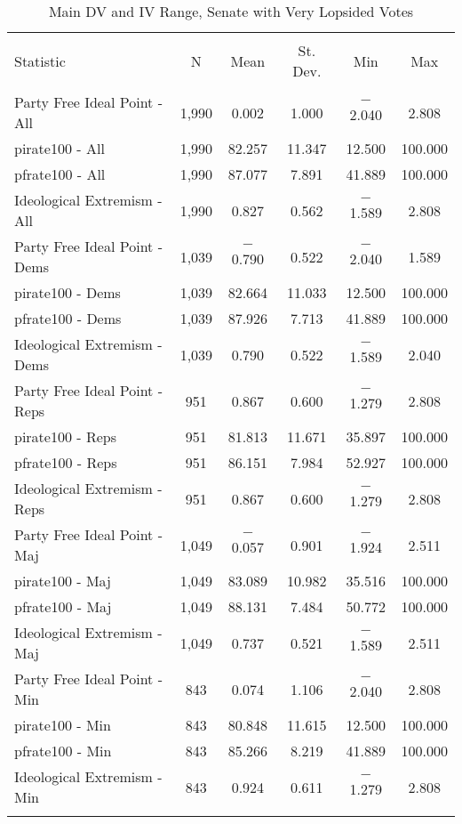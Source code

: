 \documentclass[12pt]{article}
\begin{document}
\begin{table}[!htbp] \centering 
	\caption{Main DV and IV Range, Senate with Very Lopsided Votes} 
	\begin{tabular}{@{\extracolsep{5pt}}lccccc} 
		\\[-1.8ex]\hline 
		\hline \\[-1.8ex] 
		Statistic & \multicolumn{1}{c}{N} & \multicolumn{1}{c}{Mean} & \multicolumn{1}{c}{St. Dev.} & \multicolumn{1}{c}{Min} & \multicolumn{1}{c}{Max} \\ 
		\hline \\[-1.8ex] 
		Party Free Ideal Point - All & 1,990 & 0.002 & 1.000 & $-$2.040 & 2.808 \\ 
		pirate100 - All & 1,990 & 82.257 & 11.347 & 12.500 & 100.000 \\ 
		pfrate100 - All & 1,990 & 87.077 & 7.891 & 41.889 & 100.000 \\ 
		Ideological Extremism - All & 1,990 & 0.827 & 0.562 & $-$1.589 & 2.808 \\ 
		\hline
		Party Free Ideal Point - Dems & 1,039 & $-$0.790 & 0.522 & $-$2.040 & 1.589 \\ 
		pirate100 - Dems & 1,039 & 82.664 & 11.033 & 12.500 & 100.000 \\ 
		pfrate100 - Dems & 1,039 & 87.926 & 7.713 & 41.889 & 100.000 \\ 
		Ideological Extremism - Dems & 1,039 & 0.790 & 0.522 & $-$1.589 & 2.040 \\ 
		\hline 
		Party Free Ideal Point - Reps & 951 & 0.867 & 0.600 & $-$1.279 & 2.808 \\ 
		pirate100 - Reps & 951 & 81.813 & 11.671 & 35.897 & 100.000 \\ 
		pfrate100 - Reps & 951 & 86.151 & 7.984 & 52.927 & 100.000 \\ 
		Ideological Extremism - Reps & 951 & 0.867 & 0.600 & $-$1.279 & 2.808 \\
		\hline
		Party Free Ideal Point - Maj & 1,049 & $-$0.057 & 0.901 & $-$1.924 & 2.511 \\ 
		pirate100 - Maj & 1,049 & 83.089 & 10.982 & 35.516 & 100.000 \\ 
		pfrate100 - Maj & 1,049 & 88.131 & 7.484 & 50.772 & 100.000 \\ 
		Ideological Extremism - Maj & 1,049 & 0.737 & 0.521 & $-$1.589 & 2.511 \\ 
		\hline
		Party Free Ideal Point - Min & 843 & 0.074 & 1.106 & $-$2.040 & 2.808 \\ 
		pirate100 - Min & 843 & 80.848 & 11.615 & 12.500 & 100.000 \\ 
		pfrate100 - Min & 843 & 85.266 & 8.219 & 41.889 & 100.000 \\ 
		Ideological Extremism - Min & 843 & 0.924 & 0.611 & $-$1.279 & 2.808 \\ 
		\hline \\[-1.8ex] 
	\end{tabular} 
\end{table} 
\end{document}
